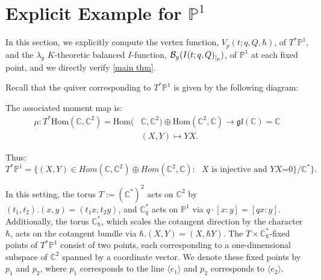 \documentclass{amsart}
\begin{document}
\section{Explicit Example for \texorpdfstring{$\mathbb{P}^1$}{P1}}
In this section, we explicitly compute the vertex function, $V_p(t;q,Q,\hbar)$, of $T^*\mathbb{P}^1$, and the $\lambda_y$ $K$-theoretic balanced $I$-function, $\mathcal{B}_{y}(I(t;q,Q)_{\arrowvert_{p}})$, of $\mathbb{P}^1$ at each fixed point, and we directly verify \cref{main thm}.

Recall that the quiver corresponding to $T^*\mathbb{P}^1$ is given by the following diagram:

\begin{center}
\end{center}

 The associated moment map is: 
\begin{align*}
   \mu:T^*\mathrm{Hom}(\mathbb{C},\mathbb{C}^2) = \mathrm{Hom}(&\mathbb{C},\mathbb{C}^2) \oplus \mathrm{Hom}(\mathbb{C}^2,\mathbb{C}) \to \mathfrak{gl}(\mathbb{C})=\mathbb{C}  \\& (X,Y) \mapsto YX.
\end{align*} 

Thus:
\[
T^*\mathbb{P}^1 = \big\{(X,Y) \in Hom(\mathbb{C},\mathbb{C}^2) \oplus Hom(\mathbb{C}^2,\mathbb{C}): \text{ $X$ is injective and $YX$=0}\}/{\mathbb{C}^*}\big\}.
\]

In this setting, the torus $T:=(\mathbb{C}^*)^2$ acts on $\mathbb{C}^2$ by $(t_1,t_2).(x,y)=(t_1x,t_2y)$, and  $\mathbb{C}_q^*$  acts on $\mathbb{P}^1$ via $q\cdot[x:y] = [qx:y]$. Additionally, the torus  $\mathbb{C}^*_{\hbar}$, which scales the cotangent direction by the character $\hbar$, acts on the cotangent bundle via $\hbar.(X,Y) = (X,\hbar Y)$.
The $T \times \mathbb{C}^*_{\hbar}$-fixed points of $T^*\mathbb{P}^1$ consist of two points, each corresponding to a one-dimensional subspace of $\mathbb{C}^2$ spanned by a coordinate vector. We denote these fixed points by $p_1$ and $p_2$, where $p_1$ corresponds to the line $\langle e_1\rangle$ and $p_2$ corresponds to $\langle e_2\rangle$.
\end{document}
